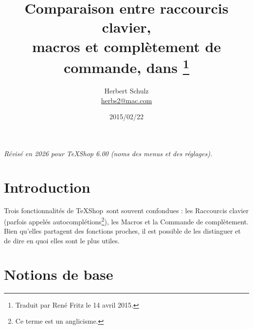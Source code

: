 \documentclass[11pt,french]{article}
\title{Comparaison entre raccourcis clavier,\\ macros et complètement de commande, dans \TS\thanks{Traduit par René Fritz le 14 avril 2015.}}
\author{Herbert Schulz\\\small\href{mailto:herbs2@mac.com}{herbs2@mac.com}}
\date{2015/02/22}
\newcommand{\cmdkey}{\textsf{cmd}}
\newcommand{\esckey}{\textsf{esc}}
\newcommand{\tabkey}{---\kern-5pt>|}
\newcommand{\cmd}[1]{\textsf{#1}}
\newcommand{\TS}{\textsf{\TeX Shop}}
\begin{document}
\maketitle
\noindent\textit{Révisé en 2026 pour TeXShop 6.00 (noms des menus et des réglages).}


\section{Introduction}



Trois fonctionnalités de \TS\ sont souvent confondues : les \cmd{Raccourcis clavier} (parfois appelés autocomplétions\footnote{Ce terme est un anglicisme.}), les \cmd{Macros} et la \cmd{Commande de complètement}. Bien qu'elles partagent des fonctions proches, il est possible de les distinguer et de dire en quoi elles sont le plus utiles.

\section{Notions de base}

%
%
\end{document}
